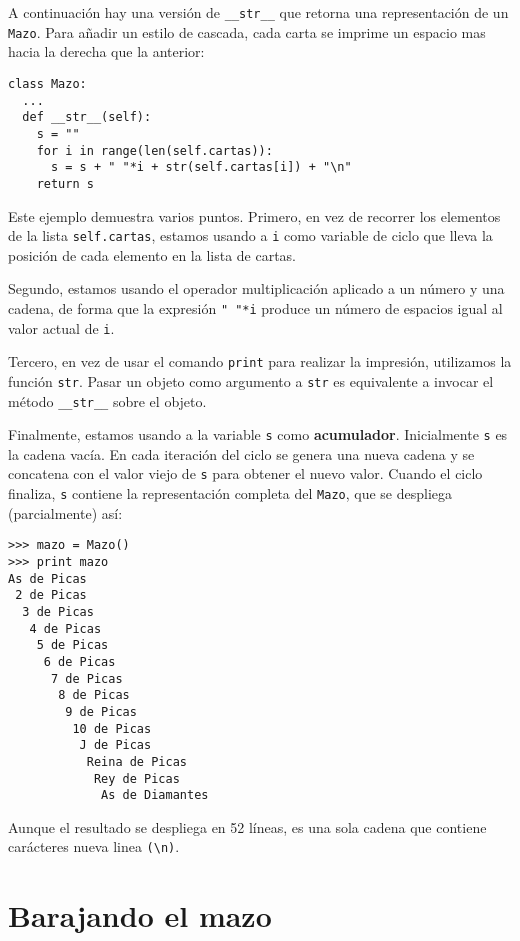 A continuación hay una versión de  \texttt{\_\_str\_\_} que retorna una representación de un  \texttt{Mazo}. 
Para añadir un estilo de cascada, cada carta se imprime un espacio mas hacia la derecha que la anterior:

\beforeverb
\begin{verbatim}
class Mazo:
  ...
  def __str__(self):
    s = ""
    for i in range(len(self.cartas)):
      s = s + " "*i + str(self.cartas[i]) + "\n"
    return s
\end{verbatim}
\afterverb
%
Este ejemplo demuestra varios puntos. Primero, en vez de recorrer los elementos
de la lista  \texttt{self.cartas}, estamos usando a \texttt{i} como variable 
de ciclo que lleva la posición de cada elemento en la lista de cartas.

Segundo, estamos usando el operador multiplicación aplicado a un número y una cadena, 
de forma que la expresión \verb+" "*i+ produce un número de espacios igual al valor actual de  \texttt{i}.

Tercero, en vez de usar el comando  \texttt{print} para realizar la impresión, utilizamos la función  \texttt{str}. 
Pasar un objeto como argumento a \texttt{str} es equivalente a invocar el método \texttt{\_\_str\_\_} sobre el objeto.



Finalmente, estamos usando a la variable \texttt{s} como {\bf acumulador}.
Inicialmente \texttt{s} es la cadena vacía.  En cada iteración del ciclo se 
genera una nueva cadena y se concatena con el valor viejo de  \texttt{s} para
obtener el nuevo valor. Cuando el ciclo finaliza, \texttt{s} contiene la 
representación completa del \texttt{Mazo}, que se despliega (parcialmente) así:



\beforeverb
\begin{verbatim}
>>> mazo = Mazo()
>>> print mazo
As de Picas
 2 de Picas
  3 de Picas
   4 de Picas
    5 de Picas
     6 de Picas
      7 de Picas
       8 de Picas
        9 de Picas
         10 de Picas
          J de Picas
           Reina de Picas
            Rey de Picas
             As de Diamantes
\end{verbatim}
\afterverb
%
Aunque el resultado se despliega en 52 líneas, es una sola cadena que
contiene carácteres nueva linea \verb+(\n)+.


\section{Barajando el mazo}

